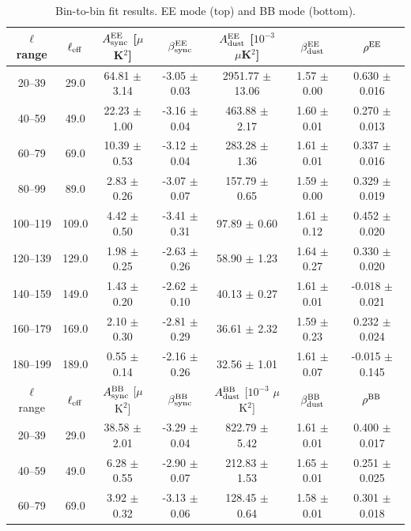 \begin{table}[htbp]
\centering
\caption{Bin-to-bin fit results. EE mode (top) and BB mode (bottom).}
\label{tab:bin_to_bin_results}
\begin{tabular}{c c c c c c c}
\hline\hline
$\ell$ range & $\ell_{\rm eff}$ & $A^{\rm EE}_{\rm sync}$ [$\mu$K$^2$] & $\beta^{\rm EE}_{\rm sync}$ & $A^{\rm EE}_{\rm dust}$ [$10^{-3}$ $\mu$K$^2$] & $\beta^{\rm EE}_{\rm dust}$ & $\rho^{\rm EE}$ \\
\hline
20--39 & 29.0 & 64.81 $\pm$ 3.14 & -3.05 $\pm$ 0.03 & 2951.77 $\pm$ 13.06 & 1.57 $\pm$ 0.00 & 0.630 $\pm$ 0.016 \\
40--59 & 49.0 & 22.23 $\pm$ 1.00 & -3.16 $\pm$ 0.04 & 463.88 $\pm$ 2.17 & 1.60 $\pm$ 0.01 & 0.270 $\pm$ 0.013 \\
60--79 & 69.0 & 10.39 $\pm$ 0.53 & -3.12 $\pm$ 0.04 & 283.28 $\pm$ 1.36 & 1.61 $\pm$ 0.01 & 0.337 $\pm$ 0.016 \\
80--99 & 89.0 & 2.83 $\pm$ 0.26 & -3.07 $\pm$ 0.07 & 157.79 $\pm$ 0.65 & 1.59 $\pm$ 0.00 & 0.329 $\pm$ 0.019 \\
100--119 & 109.0 & 4.42 $\pm$ 0.50 & -3.41 $\pm$ 0.31 & 97.89 $\pm$ 0.60 & 1.61 $\pm$ 0.12 & 0.452 $\pm$ 0.020 \\
120--139 & 129.0 & 1.98 $\pm$ 0.25 & -2.63 $\pm$ 0.26 & 58.90 $\pm$ 1.23 & 1.64 $\pm$ 0.27 & 0.330 $\pm$ 0.020 \\
140--159 & 149.0 & 1.43 $\pm$ 0.20 & -2.62 $\pm$ 0.10 & 40.13 $\pm$ 0.27 & 1.61 $\pm$ 0.01 & -0.018 $\pm$ 0.021 \\
160--179 & 169.0 & 2.10 $\pm$ 0.30 & -2.81 $\pm$ 0.29 & 36.61 $\pm$ 2.32 & 1.59 $\pm$ 0.23 & 0.232 $\pm$ 0.024 \\
180--199 & 189.0 & 0.55 $\pm$ 0.14 & -2.16 $\pm$ 0.26 & 32.56 $\pm$ 1.01 & 1.61 $\pm$ 0.07 & -0.015 $\pm$ 0.145 \\
\hline
$\ell$ range & $\ell_{\rm eff}$ & $A^{\rm BB}_{\rm sync}$ [$\mu$K$^2$] & $\beta^{\rm BB}_{\rm sync}$ & $A^{\rm BB}_{\rm dust}$ [$10^{-3}$ $\mu$K$^2$] & $\beta^{\rm BB}_{\rm dust}$ & $\rho^{\rm BB}$ \\
\hline
20--39 & 29.0 & 38.58 $\pm$ 2.01 & -3.29 $\pm$ 0.04 & 822.79 $\pm$ 5.42 & 1.61 $\pm$ 0.01 & 0.400 $\pm$ 0.017 \\
40--59 & 49.0 & 6.28 $\pm$ 0.55 & -2.90 $\pm$ 0.07 & 212.83 $\pm$ 1.53 & 1.65 $\pm$ 0.01 & 0.251 $\pm$ 0.025 \\
60--79 & 69.0 & 3.92 $\pm$ 0.32 & -3.13 $\pm$ 0.06 & 128.45 $\pm$ 0.64 & 1.58 $\pm$ 0.01 & 0.301 $\pm$ 0.018 \\

\end{tabular}
\end{table}
